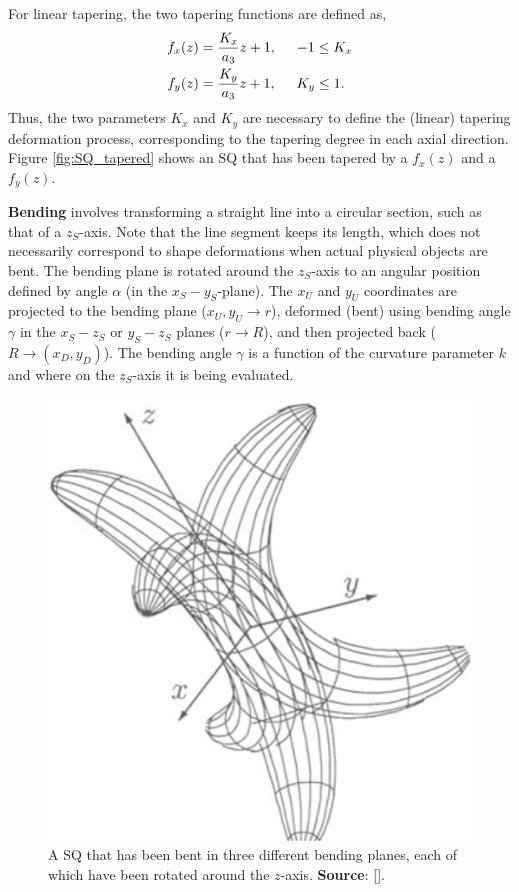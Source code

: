 For linear tapering, the two tapering functions are defined as,
\begin{align}
f_x(z) &= \frac{K_x}{a_3}z + 1, \hspace{0.5cm} -1 \leq K_x \\
f_y(z) &= \frac{K_y}{a_3}z + 1, \hspace{0.5cm} K_y \leq 1.
\end{align}
Thus, the two parameters $K_x$ and $K_y$ are necessary to define the (linear) tapering deformation process, corresponding to the tapering degree in each axial direction. Figure \ref{fig:SQ_tapered} shows an \gls{SQ} that has been tapered by a $f_x(z)$ and a $f_y(z)$. 

\textbf{Bending} involves transforming a straight line into a circular section, such as that of a $z_S$-axis. Note that the line segment keeps its length, which does not necessarily correspond to shape deformations when actual physical objects are bent.  The bending plane is rotated around the $z_S$-axis to an angular position defined by angle $\alpha$ (in the $x_S-y_S$-plane). The $x_U$ and $y_U$ coordinates are projected to the bending plane ($x_U,y_U \rightarrow r$), deformed (bent) using bending angle $\gamma$ in the $x_S-z_S$ or $y_S-z_S$ planes ($r \rightarrow R$), and then projected back ($R \rightarrow (x_D, y_D)$). The bending angle $\gamma$ is a function of the curvature parameter $k$ and where on the $z_S$-axis it is being evaluated.

\begin{figure}[h]
	\centering
	\includegraphics[width=0.25\textheight]{import/SQ_bent}
	\caption{A SQ that has been bent in three different bending planes, each of which have been rotated around the $z$-axis. \textbf{Source}: [\citeauthor{Jaklic2000}].}
	\label{fig:SQ_bent}
\end{figure}

